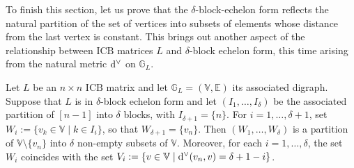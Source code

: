 \documentclass[ALCO]{cedram}
\newcommand{\mbg}{\mbox{$\mathbb{G}$}}
\newcommand{\mbv}{\mbox{$\mathbb{V}$}}
\newcommand{\mbe}{\mbox{$\mathbb{E}$}}
\newcommand{\icb}{\mbox{$\mathrm{ICB}$}}
\newcommand{\ud}{\mbox{${\rm d}^\vee$}}
\begin{document}
To finish this section, let us prove that the $\delta$-block-echelon
form reflects the natural partition of the set of vertices into
subsets of elements whose distance from the last vertex is constant.
This brings out another aspect of the relationship between $\icb$
matrices $L$ and $\delta$-block echelon form, this time arising from
the natural metric $\ud$ on $\mbg_{L}$.

\begin{lemma}\label{blockthenomega}
Let $L$ be an $n\times n$ $\icb$ matrix and let $\mbg_L=(\mbv,\mbe)$
its associated digraph. Suppose that $L$ is in $\delta$-block echelon
form and let $(I_1,\ldots, I_\delta)$ be the associated partition of
$[n-1]$ into $\delta$ blocks, with $I_{\delta+1}=\{n\}$. For
$i=1,\ldots ,\delta+1$, set $W_i:=\{v_k\in\mbv\mid k\in I_i\}$, so
that $W_{\delta+1}=\{v_n\}$. Then $(W_1,\ldots ,W_{\delta})$ is a
partition of $\mbv\setminus\{v_n\}$ into $\delta$ non-empty subsets of
$\mbv$. Moreover, for each $i=1,\ldots, \delta$, the set $W_i$
coincides with the set $V_i:=\{v\in\mbv\mid \ud(v_n,v)=\delta+1-i\}$.
\end{lemma}
\end{document}
